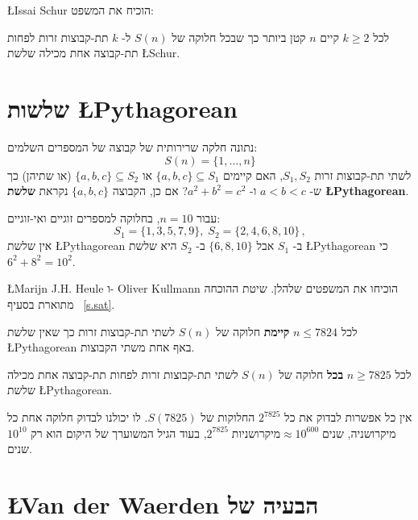 \L{Issai Schur}
הוכיח את המשפט:
\begin{theorem}[\L{Schur}]
לכל 
$k\geq 2$
קיים 
$n$
קטן ביותר כך שבכל חלוקה של
$S(n)$
ל-%
$k$
תת-קבוצות זרות לפחות תת-קבוצה אחת מכילה שלשת
\L{Schur}.
\end{theorem}


\section{שלשות
\L{\normalsize Pythagorean}}\label{s.pyth}

\begin{definition}
נתונה חלקה שרירותית של קבוצה של המספרים השלמים:
\[
S(n)=\{1,\ldots,n\}
\]
לשתי תת-קבוצות זרות
$S_1,S_2$,
האם קיימים
$\{a,b,c\}\subseteq S_1$
או
$\{a,b,c\}\subseteq S_2$
(או שתיהן) כך ש-%
$a\!<\!b\!<\!c$
ו-%
$a^2+b^2=c^2$?
אם כן, הקבוצה 
$\{a,b,c\}$
נקראת 
\textbf{שלשת \L{Pythagorean}}.
\end{definition}

\begin{example}
עבור
$n=10$,
בחלוקה למספרים זוגיים ואי-זוגיים:
\[
S_1 = \{1,3,5,7,9\},\; S_2=\{2,4,6,8,10\}\,,
\]
אין שלשת
\L{Pythagorean}
ב-%
$S_1$
אבל  
$\{6,8,10\}$
ב-%
$S_2$
היא
שלשת
\L{Pythagorean}
כי
$6^2+8^2=10^2$.
\end{example}

\L{Marijn J.H. Heule}
ו-%
Oliver Kullmann
הוכיחו את המשפטים שלהלן. שיטת ההוכחה מתוארת בסעיף%
~\ref{s.sat}.

\begin{theorem}
לכל 
$n\leq 7824$
\textbf{קיימת}
חלוקה של 
$S(n)$
לשתי תת-קבוצות זרות כך שאין שלשת
\L{Pythagorean}
באף אחת משתי הקבוצות.
\end{theorem}

\begin{theorem}
לכל 
$n\geq 7825$
\textbf{בכל}
חלוקה של 
$S(n)$
לשתי תת-קבוצות זרות לפחות תת-קבוצה אחת מכילה שלשת
\L{Pythagorean}.
\end{theorem}
אין כל אפשרות לבדוק את כל
$2^{7825}$
החלוקות של
$S(7825)$.
לו יכולנו לבדוק חלוקה אחת כל מיקרושניה, 
$2^{7825}\; \textrm{מיקרושניות}\approx 10^{600}\; \textrm{שנים}$, 
בעוד הגיל המשוערך של היקום הוא רק
$10^{10}$
שנים.


\section{\L{\normalsize Van der Waerden} הבעיה של}\label{s.van}

